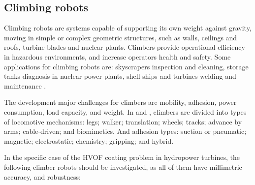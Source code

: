 \subsection{Climbing robots}\label{sota_climbers}
Climbing robots are systems capable of supporting its own weight against
gravity, moving in simple or complex geometric structures, such as
walls, ceilings and roofs, turbine blades and nuclear plants.
Climbers provide operational efficiency in hazardous environments, and increase
operators health and safety. Some applications for climbing robots are:
skyscrapers inspection and cleaning, storage tanks diagnosis in nuclear
power plants, shell ships and turbines welding and
maintenance \citep{armada2003application}.

The development major challenges for climbers are mobility, adhesion, power
consumption, load capacity, and weight. In \cite{modular} and \cite{climbsurv},
climbers are divided into types of locomotive mechanisms: legs; walker; translation; wheels; tracks;
advance by arms; cable-driven; and biomimetics. And adhesion types:
suction or pneumatic; magnetic; electrostatic; chemistry; gripping; and hybrid.

In the specific case of the HVOF coating problem in hydropower turbines, the
following climber robots should be investigated, as all of them have millimetric
accuracy, and robustness:

